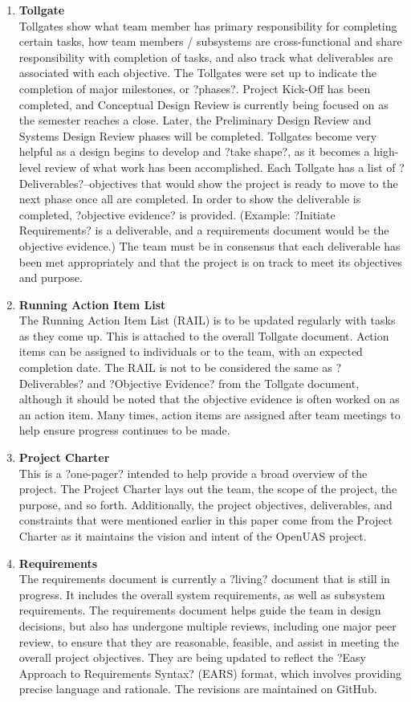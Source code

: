 \documentclass{article}
\begin{document}
\begin{enumerate}
\item \textbf{Tollgate} \\Tollgates show what team member has primary responsibility for completing certain tasks, how team members / subsystems are cross-functional and share responsibility with completion of tasks, and also track what deliverables are associated with each objective. The Tollgates were set up to indicate the completion of major milestones, or ?phases?. Project Kick-Off has been completed, and Conceptual Design Review is currently being focused on as the semester reaches a close. Later, the Preliminary Design Review and Systems Design Review phases will be completed.
Tollgates become very helpful as a design begins to develop and ?take shape?, as it becomes a high-level review of what work has been accomplished. Each Tollgate has a list of ?Deliverables?--objectives that would show the project is ready to move to the next phase once all are completed. In order to show the deliverable is completed, ?objective evidence? is provided. (Example: ?Initiate Requirements? is a deliverable, and a requirements document would be the objective evidence.) The team must be in consensus that each deliverable has been met appropriately and that the project is on track to meet its objectives and purpose.
\item \textbf{Running Action Item List} \\The Running Action Item List (RAIL) is to be updated regularly with tasks as they come up. This is attached to the overall Tollgate document. Action items can be assigned to individuals or to the team, with an expected completion date.
The RAIL is not to be considered the same as ?Deliverables? and ?Objective Evidence? from the Tollgate document, although it should be noted that the objective evidence is often worked on as an action item. Many times, action items are assigned after team meetings to help ensure progress continues to be made.
\item \textbf{Project Charter}\\ This is a ?one-pager? intended to help provide a broad overview of the project. The Project Charter lays out the team, the scope of the project, the purpose, and so forth. Additionally, the project objectives, deliverables, and constraints that were mentioned earlier in this paper come from the Project Charter as it maintains the vision and intent of the OpenUAS project.
\item \textbf{Requirements}\\ The requirements document is currently a ?living? document that is still in progress. It includes the overall system requirements, as well as subsystem requirements. The requirements document helps guide the team in design decisions, but also has undergone multiple reviews, including one major peer review, to ensure that they are reasonable, feasible, and assist in meeting the overall project objectives. They are being updated to reflect the ?Easy Approach to Requirements Syntax? (EARS) format, which involves providing precise language and rationale. The revisions are maintained on GitHub.

\end{enumerate}
\end{document}
